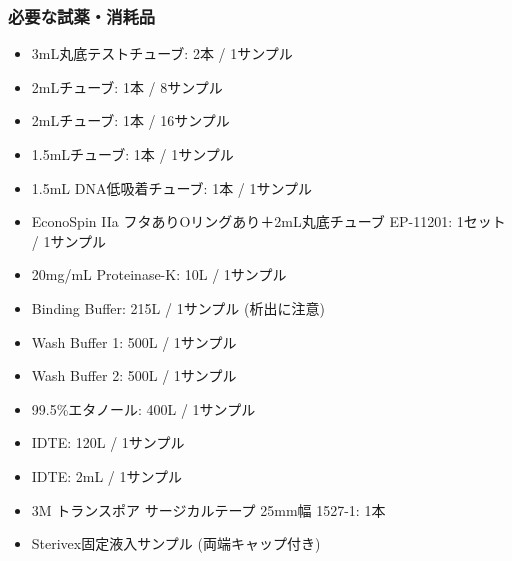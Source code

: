 \documentclass[titlepage,10pt,a4paper,uplatex]{jsbook}
\begin{document}
\subsubsection{必要な試薬・消耗品}
\begin{itemize}
\item 3mL丸底テストチューブ: 2本 / 1サンプル
\item 2mLチューブ: 1本 / 8サンプル
\item 2mLチューブ: 1本 / 16サンプル
\item 1.5mLチューブ: 1本 / 1サンプル
\item 1.5mL DNA低吸着チューブ: 1本 / 1サンプル
\item EconoSpin IIa フタありOリングあり＋2mL丸底チューブ EP-11201: 1セット / 1サンプル
\item 20mg/mL Proteinase-K: 10{\textmu}L / 1サンプル
\item Binding Buffer: 215{\textmu}L / 1サンプル (析出に注意)
\item Wash Buffer 1: 500{\textmu}L / 1サンプル
\item Wash Buffer 2: 500{\textmu}L / 1サンプル
\item 99.5\%エタノール: 400{\textmu}L / 1サンプル
\item IDTE: 120{\textmu}L / 1サンプル
\item IDTE: 2mL / 1サンプル
\item 3M トランスポア サージカルテープ 25mm幅 1527-1: 1本
\item Sterivex固定液入サンプル (両端キャップ付き)
\end{itemize}
\end{document}
